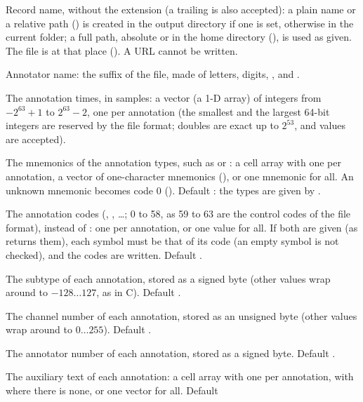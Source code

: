 \begin{params}
\item[record] Record name, without the  extension (a trailing  is
  also accepted): a plain name or a relative path () is created in the
  output directory if one is set, otherwise in the current folder; a full path, absolute
  or in the home directory (), is used as given.
  The file is  at that place (). A URL cannot
  be written.
\item[annotator] Annotator name: the suffix of the file, made of letters, digits,
  \code{\_}, \code{-} and \code{\textasciitilde}.
\item[samples] The annotation times, in samples: a vector (a 1-D array) of integers from
  $-2^{63}+1$ to $2^{63}-2$, one per annotation (the smallest and the largest 64-bit
  integers are reserved by the file format; doubles are exact up to $2^{53}$, and
   values are accepted).
\item[symbols] The mnemonics of the annotation types, such as  or : a
  cell array with one per annotation, a  vector of one-character mnemonics
  (), or one mnemonic for all. An unknown mnemonic becomes code 0
  (). Default \code{[]}: the types are given by .
\item[codes] The annotation codes (, , \ldots; 0
  to 58, as 59 to 63 are the control codes of the file format), instead of
  : one per annotation, or one value for all. If both are given
  (as  returns them), each symbol must be that of its code
  (an empty symbol is not checked), and the codes are written. Default \code{[]}.
\item[subtypes] The subtype of each annotation, stored as a signed byte (other values wrap
  around to $-128 \ldots 127$, as in C). Default .
\item[chans] The channel number of each annotation, stored as an unsigned byte (other
  values wrap around to $0 \ldots 255$). Default .
\item[nums] The annotator number of each annotation, stored as a signed byte. Default
  .
\item[aux] The auxiliary text of each annotation: a cell array with one per annotation,
  with \code{[]} where there is none, or one  vector for all. Default

\end{params}
